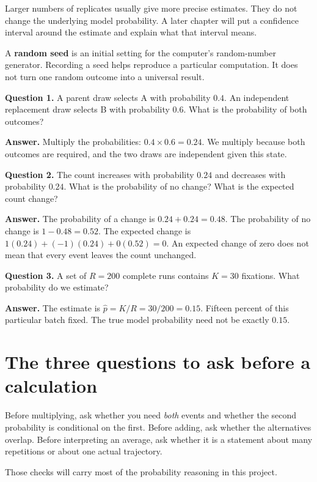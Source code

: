 Larger numbers of replicates usually give more precise estimates. They do
not change the underlying model probability. A later chapter will put a
confidence interval around the estimate and explain what that interval means.

A \textbf{random seed} is an initial setting for the computer's random-number
generator. Recording a seed helps reproduce a particular computation. It
does not turn one random outcome into a universal result.

\begin{checkpoint}
\textbf{Question 1.} A parent draw selects A with probability \(0.4\).
An independent replacement draw selects B with probability \(0.6\).
What is the probability of both outcomes?

\textbf{Answer.} Multiply the probabilities:
\(0.4\times0.6=0.24\). We multiply because both outcomes are required,
and the two draws are independent given this state.

\textbf{Question 2.} The count increases with probability \(0.24\) and
decreases with probability \(0.24\). What is the probability of no change?
What is the expected count change?

\textbf{Answer.} The probability of a change is \(0.24+0.24=0.48\).
The probability of no change is \(1-0.48=0.52\). The expected change is
\(1(0.24)+(-1)(0.24)+0(0.52)=0\). An expected change of zero does not
mean that every event leaves the count unchanged.

\textbf{Question 3.} A set of \(R=200\) complete runs contains \(K=30\)
fixations. What probability do we estimate?

\textbf{Answer.} The estimate is
\(\widehat p=K/R=30/200=0.15\). Fifteen percent of this particular batch
fixed. The true model probability need not be exactly \(0.15\).
\end{checkpoint}

\section{The three questions to ask before a calculation}

Before multiplying, ask whether you need \emph{both} events and whether the
second probability is conditional on the first. Before adding, ask whether
the alternatives overlap. Before interpreting an average, ask whether it is
a statement about many repetitions or about one actual trajectory.

Those checks will carry most of the probability reasoning in this project.
